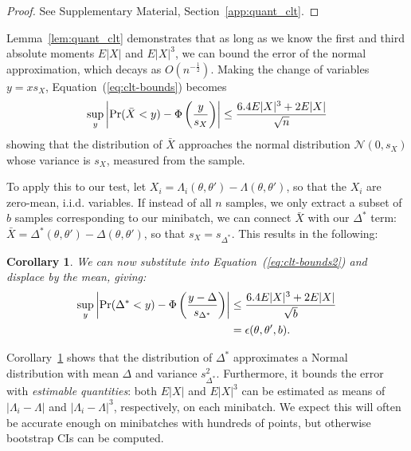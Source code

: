 \documentclass[twoside]{article} \usepackage{aistats2017}
\newtheorem{corollary}{Corollary}
\begin{document}
\begin{proof}
See Supplementary Material, Section~\ref{app:quant_clt}.
\end{proof}



Lemma~\ref{lem:quant_clt} demonstrates that as long as we know the first and
third absolute moments $E|X|$ and $E|X|^3$, we can bound the error of the normal
approximation, which decays as $O(n^{-\frac{1}{2}})$. Making the change of
variables $y = x s_X$, Equation~(\ref{eq:clt-bounds}) becomes
\begin{equation}\label{eq:clt-bounds2}
   \sup_y\left|{\rm Pr}(\bar{X}< y) - \Phi\left(\frac{y}{s_X}\right)\right| \leq \frac{6.4E|X|^3+2E|X|}{\sqrt{n}}
\end{equation}
showing that the distribution of $\bar{X}$ approaches the normal distribution
$\mathcal{N}(0,s_X)$ whose variance is $s_X$,
measured from the sample.

To apply this to our test, let $X_i = \Lambda_i(\theta,\theta') -
\Lambda(\theta,\theta')$, so that the $X_i$ are zero-mean, i.i.d. variables. If
instead of all $n$ samples, we only extract a subset of $b$ samples
corresponding to our minibatch, we can connect $\bar{X}$ with our $\Delta^*$
term: $\bar{X} = \Delta^*(\theta,\theta') - \Delta(\theta,\theta')$, so that
$s_X = s_{\Delta^*}$. This results in the following:

\begin{corollary}\label{cor:our_bound_delta_prime}
We can now substitute into Equation~(\ref{eq:clt-bounds2}) and displace by the mean, giving:
\begin{align*}
    \sup_y\left|{\rm Pr}(\Delta^*< y) - \Phi\left(\frac{y-\Delta}{s_{\Delta^*}}\right)\right| &\leq \frac{6.4E|X|^3+2E|X|}{\sqrt{b}} \\
    &= \epsilon(\theta,\theta',b).
\end{align*}
\end{corollary} %
Corollary~\ref{cor:our_bound_delta_prime} shows that the distribution of
$\Delta^*$ approximates a Normal distribution with mean $\Delta$ and variance
$s^2_{\Delta^*}$. Furthermore, it bounds the error with \emph{estimable
quantities}: both $E|X|$ and $E|X|^3$ can be estimated as means of $|\Lambda_i
- \Lambda|$ and $|\Lambda_i - \Lambda|^3$, respectively, on each minibatch. We
expect this will often be accurate enough on minibatches with hundreds of
points, but otherwise bootstrap CIs can be computed.
\end{document}
